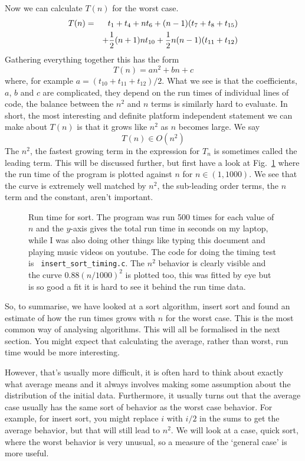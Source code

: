 \documentclass[11pt,a4paper]{scrartcl}
\begin{document}
Now we can calculate $T(n)$ for the worst case.
\begin{eqnarray}
T(n)&=&t_1+t_4+nt_6+(n-1)(t_7+t_8+t_{15})\cr&&+\frac{1}{2}(n+1)nt_{10}+\frac{1}{2}n(n-1)(t_{11}+t_{12})
\end{eqnarray}
Gathering everything together this has the form
\begin{equation}
T(n)=an^2+bn+c
\end{equation}
where, for example $a=(t_{10}+t_{11}+t_{12})/2$. What we see is that
the coefficients, $a$, $b$ and $c$ are complicated, they depend on the
run times of individual lines of code, the balance between the $n^2$
and $n$ terms is similarly hard to evaluate. In short, the most
interesting and definite platform independent statement we can make
about $T(n)$ is that it grows like $n^2$ as $n$ becomes large. We say
\begin{equation}
T(n)\in O(n^2)
\end{equation}
The $n^2$, the fastest growing term in the expression for $T_n$ is
sometimes called the leading term. This will be discussed further, but
first have a look at Fig.~\ref{fig_insert_sort_timing} where the run
time of the program is plotted against $n$ for $n\in(1,1000)$. We see
that the curve is extremely well matched by $n^2$, the sub-leading
order terms, the $n$ term and the constant, aren't important.

\begin{figure}

\caption{Run time for sort. The program was run 500 times for each
  value of $n$ and the $y$-axis gives the total run time in seconds on
  my laptop, while I was also doing other things like typing this
  document and playing music videos on youtube. The code for doing the
  timing test is \texttt{  insert\_sort\_timing.c}. The $n^2$ behavior is
  clearly visible and the curve $0.88(n/1000)^2$ is plotted too, this
  was fitted by eye but is so good a fit it is hard to see it behind
  the run time data.\label{fig_insert_sort_timing}}
\end{figure}

So, to summarise, we have looked at a sort algorithm, insert sort and
found an estimate of how the run times grows with $n$ for the worst
case. This is the most common way of analysing algorithms. This will
all be formalised in the next section. You might expect that
calculating the average, rather than worst, run time would be more
interesting. 

However, that's usually more difficult, it is often hard to think
about exactly what average means and it always involves making some
assumption about the distribution of the initial data. Furthermore, it
usually turns out that the average case usually has the same sort of
behavior as the worst case behavior. For example, for insert sort, you
might replace $i$ with $i/2$ in the sums to get the average behavior,
but that will still lead to $n^2$. We will look at a case, quick sort,
where the worst behavior is very unusual, so a measure of the
\lq{}general case\rq{} is more useful.
\end{document}
